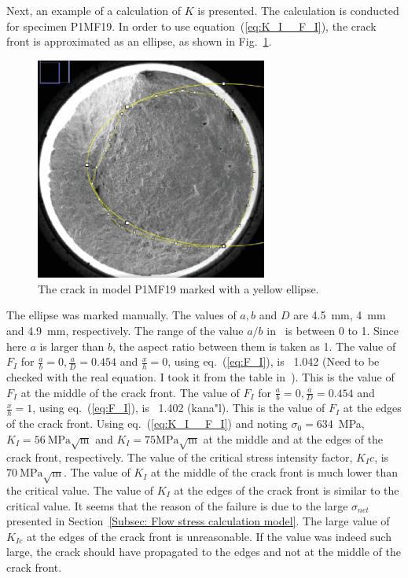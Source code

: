 \documentclass[preprint,12pt]{elsarticle}
\begin{document}
Next, an example of a calculation of $K$ is presented.
The calculation is conducted for specimen P1MF19.
In order to use equation~(\ref{eq:K_I__F_I}), the crack front is approximated as an ellipse, as shown in Fig.~\ref{fig:P1MF19_elip_crack}.
%
\begin{figure}[t!]
  \begin{center}
  \includegraphics[width=3in]{P1MF19_elip_crack.eps}
  \caption{The crack in model P1MF19 marked with a yellow ellipse.}
  \label{fig:P1MF19_elip_crack}
   \end{center}
\end{figure}
%
The ellipse was marked manually.
The values of $a, b$ and $D$ are 4.5~mm, 4~mm and 4.9~mm, respectively.
The range of the value $a/b$ in~\cite{shin2004experimental} is between 0 to 1.
Since here $a$ is larger than $b$, the aspect ratio between them is taken as 1.
The value of $F_I$ for $\frac{a}{b}=0, \frac{a}{D}=0.454$ and $\frac{x}{h}=0$, using eq.~(\ref{eq:F_I}), is ~1.042 (Need to be checked with the real equation. I took it from the table in~\cite{shin2004experimental}).
This is the value of $F_I$ at the middle of the crack front.
The value of $F_I$ for $\frac{a}{b}=0, \frac{a}{D}=0.454$ and $\frac{x}{h}=1$, using eq.~(\ref{eq:F_I}), is ~1.402 (kana"l).
This is the value of $F_I$ at the edges of the crack front.
Using eq.~(\ref{eq:K_I__F_I}) and noting $\sigma_0=634$~MPa, $K_I=56~\mbox{MPa}\sqrt{\mbox{m}}$ and $K_I=75\mbox{MPa}\sqrt{\mbox{m}}$ at the middle and at the edges of the crack front, respectively.
The value of the critical stress intensity factor, $K_Ic$, is $70~\mbox{MPa}\sqrt{\mbox{m}}$.
The value of $K_I$ at the middle of the crack front is much lower than the critical value.
The value of $K_I$ at the edges of the crack front is similar to the critical value.
It seems that the reason of the failure is due to the large $\sigma_{net}$ presented in Section~\ref{Subsec: Flow stress calculation model}.
The large value of $K_{Ic}$ at the edges of the crack front is unreasonable.
If the value was indeed such large, the crack should have propagated to the edges and not at the middle of the crack front.
\end{document}
